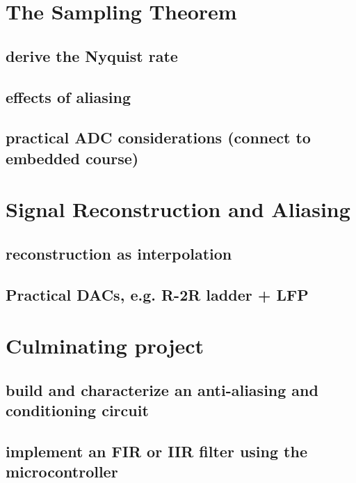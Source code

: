 \documentclass{article}
\begin{document}
\section{The Sampling Theorem}
\label{sec:org86060d9}

\subsection{derive the Nyquist rate}
\label{sec:org5c6408b}

\subsection{effects of aliasing}
\label{sec:org6646e99}

\subsection{practical ADC considerations (connect to embedded course)}
\label{sec:org392e289}

\section{Signal Reconstruction and Aliasing}
\label{sec:orgd8bc19e}

\subsection{reconstruction as interpolation}
\label{sec:org611b884}

\subsection{Practical DACs, e.g. R-2R ladder + LFP}
\label{sec:org453776d}

\section{Culminating project}
\label{sec:orgc32fcee}

\subsection{build and characterize an anti-aliasing and conditioning circuit}
\label{sec:org9327da8}

\subsection{implement an FIR or IIR filter using the microcontroller}
\label{sec:org1a5c706}
\end{document}
